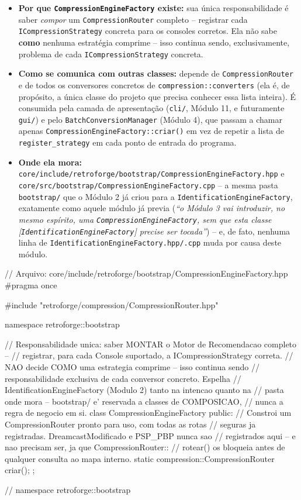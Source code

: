 \begin{itemize}
    \item \textbf{Por que \texttt{CompressionEngineFactory} existe:} sua única responsabilidade é saber \textit{compor} um \texttt{CompressionRouter} completo -- registrar cada \texttt{ICompressionStrategy} concreta para os consoles corretos. Ela não sabe \textbf{como} nenhuma estratégia comprime -- isso continua sendo, exclusivamente, problema de cada \texttt{ICompressionStrategy} concreta.
    \item \textbf{Como se comunica com outras classes:} depende de \texttt{CompressionRouter} e de todos os conversores concretos de \texttt{compression::converters} (ela é, de propósito, a única classe do projeto que precisa conhecer essa lista inteira). É consumida pela camada de apresentação (\texttt{cli/}, Módulo 11, e futuramente \texttt{gui/}) e pelo \texttt{BatchConversionManager} (Módulo 4), que passam a chamar apenas \texttt{CompressionEngineFactory::criar()} em vez de repetir a lista de \texttt{register\_strategy} em cada ponto de entrada do programa.
    \item \textbf{Onde ela mora:} \texttt{core/include/retroforge/bootstrap/CompressionEngineFactory.hpp} e \texttt{core/src/bootstrap/CompressionEngineFactory.cpp} -- a mesma pasta \texttt{bootstrap/} que o Módulo 2 já criou para a \texttt{IdentificationEngineFactory}, exatamente como aquele módulo já previa (\textit{``o Módulo 3 vai introduzir, no mesmo espírito, uma \texttt{CompressionEngineFactory}, sem que esta classe [\texttt{IdentificationEngineFactory}] precise ser tocada''}) -- e, de fato, nenhuma linha de \texttt{IdentificationEngineFactory.hpp/.cpp} muda por causa deste módulo.
\end{itemize}

\begin{CaixaCodigo}
// Arquivo: core/include/retroforge/bootstrap/CompressionEngineFactory.hpp
#pragma once

#include "retroforge/compression/CompressionRouter.hpp"

namespace retroforge::bootstrap {

// Responsabilidade unica: saber MONTAR o Motor de Recomendacao completo --
// registrar, para cada Console suportado, a ICompressionStrategy correta.
// NAO decide COMO uma estrategia comprime -- isso continua sendo
// responsabilidade exclusiva de cada conversor concreto. Espelha
// IdentificationEngineFactory (Modulo 2) tanto na intencao quanto na
// pasta onde mora -- bootstrap/ e' reservada a classes de COMPOSICAO,
// nunca a regra de negocio em si.
class CompressionEngineFactory {
public:
    // Constroi um CompressionRouter pronto para uso, com todas as rotas
    // seguras ja registradas. DreamcastModificado e PSP_PBP nunca sao
    // registrados aqui -- e nao precisam ser, ja que CompressionRouter::
    // rotear() os bloqueia antes de qualquer consulta ao mapa interno.
    static compression::CompressionRouter criar();
};

} // namespace retroforge::bootstrap
\end{CaixaCodigo}

